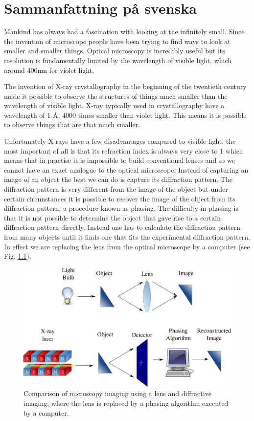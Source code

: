 \chapter{Sammanfattning p{\aa} svenska}\noindent

Mankind has always had a fascination with looking at the infinitely
small. Since the invention of microscope people have been trying to find ways to
look at smaller and smaller things. Optical microscopy is incredibly useful but
its resolution is fundamentally limited by the wavelength of visible light, which
around 400nm for violet light. 

The invention of X-ray crystallography in
the beginning of the twentieth century made it possible to observe the
structures of things much smaller than the wavelength of visible light. X-ray
typically used in crystallography have a wavelength of 1 \AA, 4000 times smaller
than violet light. This means it is possible to observe things that are that
much smaller. 

Unfortunately X-rays have a few disadvantages compared to visible
light, the most important of all is that its refraction index is always very
close to 1 which means that in practise it is impossible to build conventional
lenses and so we cannot have an exact analogue to the optical
microscope. Instead of capturing an image of an object the best we can do is
capture its diffraction pattern. The diffraction pattern is very different from
the image of the object but under certain circunstances it is possible to
recover the image of the object from its diffraction pattern, a procedure known
as phasing. The difficulty in phasing is that it is not possible to determine
the object that gave rise to a certain diffraction pattern directly. Instead one
has to calculate the diffraction pattern from many objects until it finds one
that fits the experimental diffraction pattern. In effect we are replacing the
lens from the optical microscope by a computer (see Fig. \ref{Fig:lens_computer}).

\begin{figure}[ht]
\centering
  \includegraphics[width=1.0 \columnwidth]{lens_computer_analogy.png}
  \caption{Comparison of microscopy imaging using a lens and diffractive
    imaging, where the lens is replaced by a phasing algorithm executed by a computer. }
  \label{Fig:lens_computer}
\end{figure}

